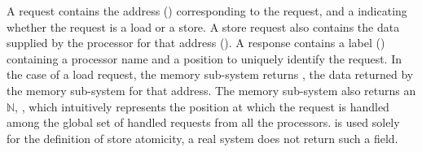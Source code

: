 
A request contains the address (\addrQ) corresponding to the request, and a
\desc{} indicating whether the request is a load or a store. A store request
also contains the data supplied by the processor for that address (\dataQ). A
response contains a label () containing a processor name and a position
to uniquely identify the request.  In the case of a load request, the memory
sub-system returns \dataR, the data returned by the memory sub-system for that
address. The memory sub-system also returns an $\mathbb{N}$, \timeR, which
intuitively represents the position at which the request is handled among the
global set of handled requests from all the processors. \timeR{} is used solely
for the definition of store atomicity, a real system does not return such a
field.



